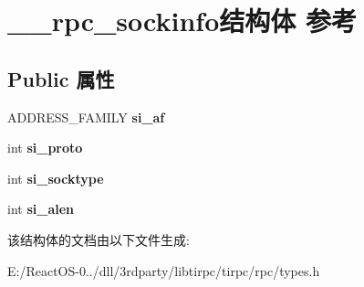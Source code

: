 \hypertarget{struct____rpc__sockinfo}{}\section{\+\_\+\+\_\+rpc\+\_\+sockinfo结构体 参考}
\label{struct____rpc__sockinfo}
\subsection*{Public 属性}
\begin{DoxyCompactItemize}
\item 
\mbox{\label{struct____rpc__sockinfo_a925f1089981a1c893388e065ffd94fec}} 
A\+D\+D\+R\+E\+S\+S\+\_\+\+F\+A\+M\+I\+LY {\bfseries si\+\_\+af}
\item 
\mbox{\label{struct____rpc__sockinfo_acdb7e516cec4f052eb384b77253a1ade}} 
int {\bfseries si\+\_\+proto}
\item 
\mbox{\label{struct____rpc__sockinfo_a0acd251a62d331b761b0efdaf8a852c8}} 
int {\bfseries si\+\_\+socktype}
\item 
\mbox{\label{struct____rpc__sockinfo_a638d3caf6e676cc75455082129ddfd3a}} 
int {\bfseries si\+\_\+alen}
\end{DoxyCompactItemize}


该结构体的文档由以下文件生成\+:\begin{DoxyCompactItemize}
\item 
E\+:/\+React\+O\+S-\/0../dll/3rdparty/libtirpc/tirpc/rpc/types.\+h\end{DoxyCompactItemize}
